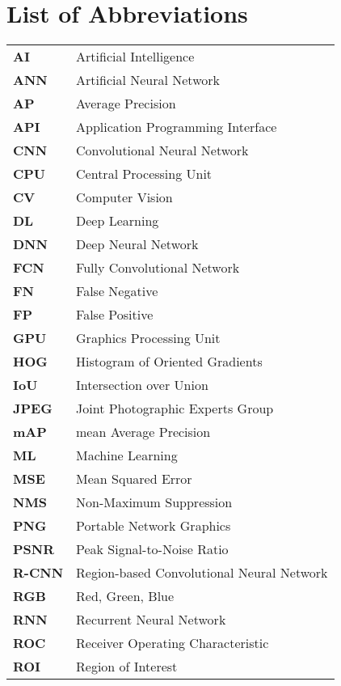 \chapter*{List of Abbreviations}

\begin{longtable}{ll}
    \textbf{AI} & Artificial Intelligence \\
    \textbf{ANN} & Artificial Neural Network \\
    \textbf{AP} & Average Precision \\
    \textbf{API} & Application Programming Interface \\
    \textbf{CNN} & Convolutional Neural Network \\
    \textbf{CPU} & Central Processing Unit \\
    \textbf{CV} & Computer Vision \\
    \textbf{DL} & Deep Learning \\
    \textbf{DNN} & Deep Neural Network \\
    \textbf{FCN} & Fully Convolutional Network \\
    \textbf{FN} & False Negative \\
    \textbf{FP} & False Positive \\
    \textbf{GPU} & Graphics Processing Unit \\
    \textbf{HOG} & Histogram of Oriented Gradients \\
    \textbf{IoU} & Intersection over Union \\
    \textbf{JPEG} & Joint Photographic Experts Group \\
    \textbf{mAP} & mean Average Precision \\
    \textbf{ML} & Machine Learning \\
    \textbf{MSE} & Mean Squared Error \\
    \textbf{NMS} & Non-Maximum Suppression \\
    \textbf{PNG} & Portable Network Graphics \\
    \textbf{PSNR} & Peak Signal-to-Noise Ratio \\
    \textbf{R-CNN} & Region-based Convolutional Neural Network \\
    \textbf{RGB} & Red, Green, Blue \\
    \textbf{RNN} & Recurrent Neural Network \\
    \textbf{ROC} & Receiver Operating Characteristic \\
    \textbf{ROI} & Region of Interest \\

\end{longtable}
